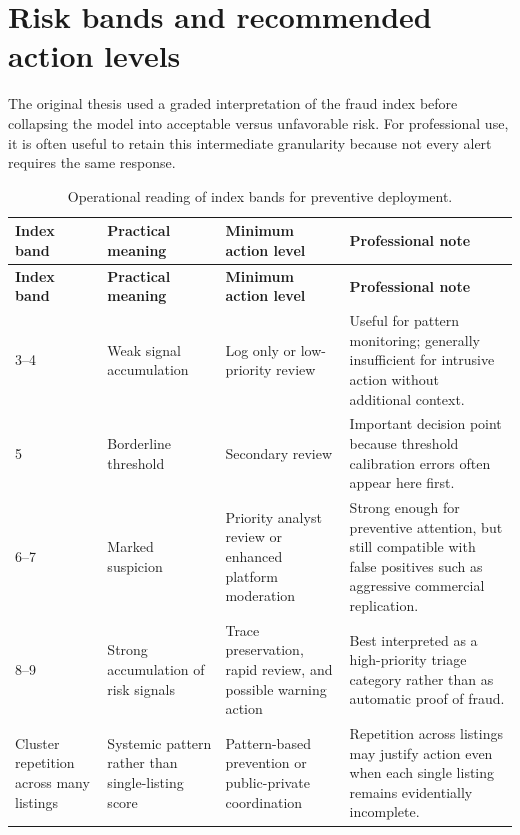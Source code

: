 \documentclass[11pt,a4paper]{article}
\begin{document}
{\newpage}

\section{Risk bands and recommended action levels}
The original thesis used a graded interpretation of the fraud index before collapsing the model into acceptable versus unfavorable risk. For professional use, it is often useful to retain this intermediate granularity because not every alert requires the same response.

\begin{longtable}{p{2.0cm} p{2.8cm} p{3.5cm} p{6.0cm}}
\caption{Operational reading of index bands for preventive deployment.}\\
\toprule
\textbf{Index band} & \textbf{Practical meaning} & \textbf{Minimum action level} & \textbf{Professional note} \\
\midrule
\endfirsthead
\toprule
\textbf{Index band} & \textbf{Practical meaning} & \textbf{Minimum action level} & \textbf{Professional note} \\
\midrule
\endhead
3--4 & Weak signal accumulation & Log only or low-priority review & Useful for pattern monitoring; generally insufficient for intrusive action without additional context. \\
5 & Borderline threshold & Secondary review & Important decision point because threshold calibration errors often appear here first. \\
6--7 & Marked suspicion & Priority analyst review or enhanced platform moderation & Strong enough for preventive attention, but still compatible with false positives such as aggressive commercial replication. \\
8--9 & Strong accumulation of risk signals & Trace preservation, rapid review, and possible warning action & Best interpreted as a high-priority triage category rather than as automatic proof of fraud. \\
Cluster repetition across many listings & Systemic pattern rather than single-listing score & Pattern-based prevention or public-private coordination & Repetition across listings may justify action even when each single listing remains evidentially incomplete. \\
\bottomrule
\end{longtable}

{\newpage}
\end{document}
